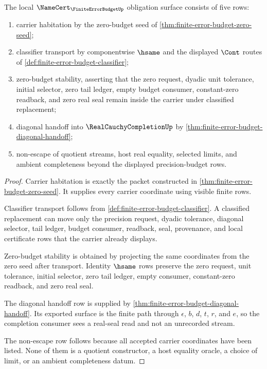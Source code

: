 \begin{theorem}
\label{thm:finite-error-budget-namecert-obligations}
The local $\NameCert_{\FiniteErrorBudgetUp}$ obligation surface consists of
five rows:
\begin{enumerate}
\item carrier habitation by the zero-budget seed of
\autoref{thm:finite-error-budget-zero-seed};
\item classifier transport by componentwise $\hsame$ and the displayed $\Cont$
routes of \autoref{def:finite-error-budget-classifier};
\item zero-budget stability, asserting that the zero request, dyadic unit
tolerance, initial selector, zero tail ledger, empty budget consumer,
constant-zero readback, and zero real seal remain inside the carrier under
classified replacement;
\item diagonal handoff into $\RealCauchyCompletionUp$ by
\autoref{thm:finite-error-budget-diagonal-handoff};
\item non-escape of quotient streams, host real equality, selected limits, and
ambient completeness beyond the displayed precision-budget rows.
\end{enumerate}
\end{theorem}
\begin{proof}
Carrier habitation is exactly the packet constructed in
\autoref{thm:finite-error-budget-zero-seed}. It supplies every carrier
coordinate using visible finite rows.

Classifier transport follows from
\autoref{def:finite-error-budget-classifier}. A classified replacement can move
only the precision request, dyadic tolerance, diagonal selector, tail ledger,
budget consumer, readback, seal, provenance, and local certificate rows that
the carrier already displays.

Zero-budget stability is obtained by projecting the same coordinates from the
zero seed after transport. Identity $\hsame$ rows preserve the zero request,
unit tolerance, initial selector, zero tail ledger, empty consumer,
constant-zero readback, and zero real seal.

The diagonal handoff row is supplied by
\autoref{thm:finite-error-budget-diagonal-handoff}. Its exported surface is the
finite path through $\epsilon$, $b$, $d$, $t$, $r$, and $e$, so the completion
consumer sees a real-seal read and not an unrecorded stream.

The non-escape row follows because all accepted carrier coordinates have been
listed. None of them is a quotient constructor, a host equality oracle, a
choice of limit, or an ambient completeness datum.
\end{proof}

